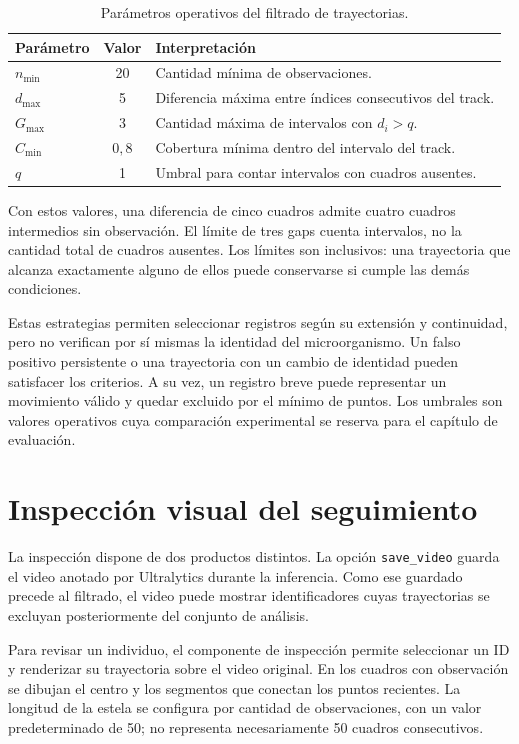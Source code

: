 \begin{table}[htbp]
  \centering
  \small
  \caption{Parámetros operativos del filtrado de trayectorias.}
  \label{tab:filtros-seguimiento}
  \begin{tabularx}{\textwidth}{@{}l c X@{}}
    \toprule
    Parámetro & Valor & Interpretación \\
    \midrule
    $n_{\min}$ & 20 & Cantidad mínima de observaciones. \\
    $d_{\max}$ & 5 & Diferencia máxima entre índices consecutivos del track. \\
    $G_{\max}$ & 3 & Cantidad máxima de intervalos con $d_i>q$. \\
    $C_{\min}$ & $0{,}8$ & Cobertura mínima dentro del intervalo del track. \\
    $q$ & 1 & Umbral para contar intervalos con cuadros ausentes. \\
    \bottomrule
  \end{tabularx}
\end{table}

Con estos valores, una diferencia de cinco cuadros admite cuatro cuadros intermedios sin observación. El límite de tres gaps cuenta intervalos, no la cantidad total de cuadros ausentes. Los límites son inclusivos: una trayectoria que alcanza exactamente alguno de ellos puede conservarse si cumple las demás condiciones.

Estas estrategias permiten seleccionar registros según su extensión y continuidad, pero no verifican por sí mismas la identidad del microorganismo. Un falso positivo persistente o una trayectoria con un cambio de identidad pueden satisfacer los criterios. A su vez, un registro breve puede representar un movimiento válido y quedar excluido por el mínimo de puntos. Los umbrales son valores operativos cuya comparación experimental se reserva para el capítulo de evaluación.

\section{Inspección visual del seguimiento}

La inspección dispone de dos productos distintos. La opción \texttt{save\_video} guarda el video anotado por Ultralytics durante la inferencia. Como ese guardado precede al filtrado, el video puede mostrar identificadores cuyas trayectorias se excluyan posteriormente del conjunto de análisis.

Para revisar un individuo, el componente de inspección permite seleccionar un ID y renderizar su trayectoria sobre el video original. En los cuadros con observación se dibujan el centro y los segmentos que conectan los puntos recientes. La longitud de la estela se configura por cantidad de observaciones, con un valor predeterminado de 50; no representa necesariamente 50 cuadros consecutivos.


